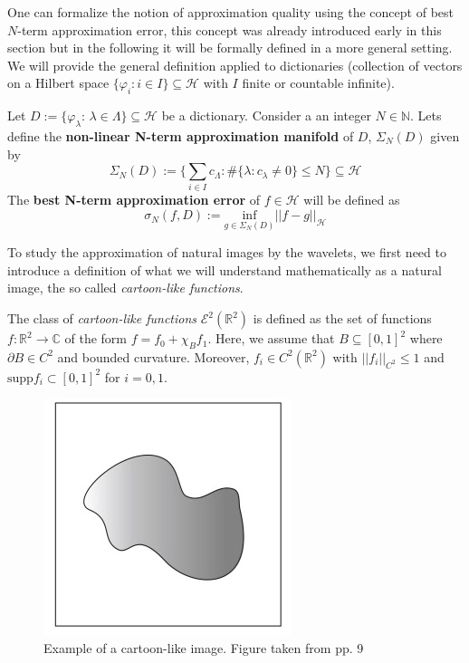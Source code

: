 \bigskip

One can formalize the notion of approximation quality using the concept of best $N$-term approximation error, this concept was already introduced early in this section but in the following it will be formally defined in a more general setting. We will provide the general definition applied to dictionaries (collection of vectors on a Hilbert space $\{\varphi_i: i\in I\}\subseteq \mathcal{H}$ with $I$ finite or countable infinite).

\bigskip

\begin{defn}
Let $D:=\{\varphi_{\lambda}\text{:  }\lambda\in \Lambda\}\subseteq \mathcal{H}$ be a dictionary. Consider a an integer $N\in\mathbb{N}$. Lets define the \textbf{non-linear N-term approximation manifold} of $D$, $\Sigma_N(D)$ given by
$$
\Sigma_N(D):=\{ \sum_{i\in I}c_{\Lambda}:\#\{\lambda : c_{\lambda}\neq 0\}\leq N\}\subseteq \mathcal{H}
$$
The \textbf{best N-term approximation error} of $f\in\mathcal{H}$ will be defined as 
$$
\sigma_N(f,D):=\underset{g\in \Sigma_N(D)}{\text{inf}}||f-g||_{\mathcal{H}}
$$
\end{defn}

\bigskip

To study the approximation of natural images by the wavelets, we first need to introduce a definition of what we will understand mathematically as a natural image, the so called \textit{cartoon-like functions}.

\bigskip

\begin{defn}
The class of \textit{cartoon-like functions} $\mathcal{E}^2(\mathbb{R}^2)$ is defined as the set of functions $f:\mathbb{R}^2\longrightarrow \mathbb{C}$ of the form $f= f_0+\chi_B f_1$. Here, we assume that $B\subseteq [0,1]^2$ where $\partial B\in C^2$ and bounded curvature. Moreover, $f_i\in C^2(\mathbb{R}^2)$ with $||f_i||_{C^2}\leq 1$ and $\text{supp} f_i\subset [0,1]^2$ for $i=0,1$. 
\end{defn}

\bigskip

\begin{figure}[h!]
\centering
\includegraphics[width = 0.4 \textwidth]{./Diagrams/cartoon-like.jpg}
\caption{Example of a cartoon-like image. Figure taken from \cite{IntroShearlets} pp. 9}
\label{fig:cartoon-like}
\end{figure}

